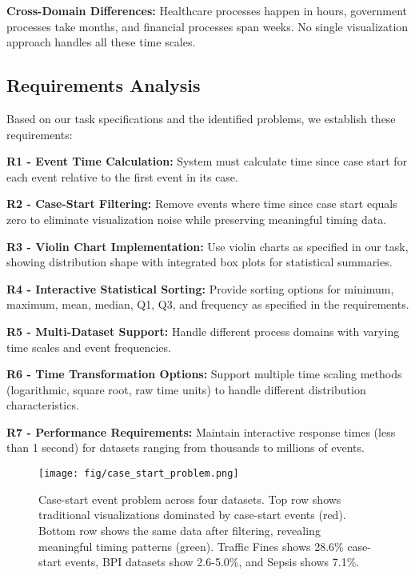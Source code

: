 \textbf{Cross-Domain Differences:} Healthcare processes happen in hours, government processes take months, and financial processes span weeks. No single visualization approach handles all these time scales.

\subsection{Requirements Analysis}
\label{subsec:requirements}

Based on our task specifications and the identified problems, we establish these requirements:

\textbf{R1 - Event Time Calculation:} System must calculate time since case start for each event relative to the first event in its case.

\textbf{R2 - Case-Start Filtering:} Remove events where time since case start equals zero to eliminate visualization noise while preserving meaningful timing data.

\textbf{R3 - Violin Chart Implementation:} Use violin charts as specified in our task, showing distribution shape with integrated box plots for statistical summaries.

\textbf{R4 - Interactive Statistical Sorting:} Provide sorting options for minimum, maximum, mean, median, Q1, Q3, and frequency as specified in the requirements.

\textbf{R5 - Multi-Dataset Support:} Handle different process domains with varying time scales and event frequencies.

\textbf{R6 - Time Transformation Options:} Support multiple time scaling methods (logarithmic, square root, raw time units) to handle different distribution characteristics.

\textbf{R7 - Performance Requirements:} Maintain interactive response times (less than 1 second) for datasets ranging from thousands to millions of events.

\begin{figure}[H]
\centering
\texttt{[image: fig/case\_start\_problem.png]}
\caption{Case-start event problem across four datasets. Top row shows traditional visualizations dominated by case-start events (red). Bottom row shows the same data after filtering, revealing meaningful timing patterns (green). Traffic Fines shows 28.6\% case-start events, BPI datasets show 2.6-5.0\%, and Sepsis shows 7.1\%.}
\label{fig:case_start_problem}
\end{figure}
